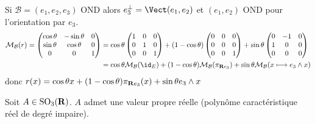 \begin{rem}
    Si $\mathcal B=(e_1, e_2, e_3)$ OND alors $e_3^\bot=\Vect(e_1, e_2)$ et $(e_1, e_2)$ OND pour l'orientation par $e_3$.
     \begin{align*}
         \mathcal  M_{\mathcal  B}(r) =
         \begin{pmatrix}
             \cos \theta & - \sin \theta & 0 \\
             \sin \theta & \cos \theta & 0 \\
             0 & 0& 1
         \end{pmatrix}
                                      &= \cos \theta
                                      \begin{pmatrix}
                                          1&0&0\\
                                          0&1&0\\
                                          0&0&1
                                      \end{pmatrix} +
                                      (1-\cos \theta)
                                      \begin{pmatrix}
                                          0&0&0\\
                                          0&0&0\\
                                          0&0&1
                                      \end{pmatrix}
                                      + \sin \theta
                                      \begin{pmatrix}
                                          0&-1&0\\
                                          1&0&0\\
                                          0&0&0
                                      \end{pmatrix}\\
                                      &=
                                      \cos \theta \mathcal M_{\mathcal  B}(\id_E)+(1-\cos \theta) \mathcal  M_{\mathcal  B} (\pi_{\R e_3}) + \sin \theta \mathcal  M_{\mathcal  B}(x \longmapsto e_3\wedge x)
    \end{align*}
    donc $r(x)=\cos \theta x + (1-\cos \theta) \pi_{\mathbf R e_3}(x)+\sin \theta e_3 \wedge x$
\end{rem}

Soit $A \in \mathrm {SO}_3(\mathbf R)$. $A$ admet une valeur propre réelle (polynôme caractéristique réel de degré impaire).

